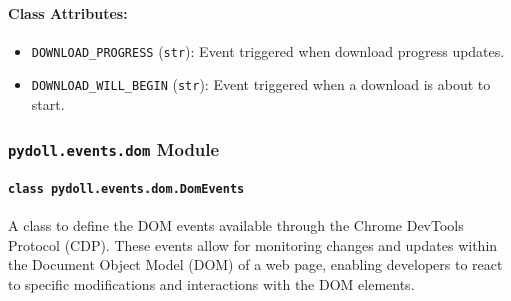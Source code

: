 \documentclass{article}
\begin{document}
\paragraph{Class Attributes:}
\begin{itemize}
    \item \texttt{DOWNLOAD\_PROGRESS} (\texttt{str}): Event triggered when download progress updates.
    \item \texttt{DOWNLOAD\_WILL\_BEGIN} (\texttt{str}): Event triggered when a download is about to start.
\end{itemize}

\subsubsection*{\texttt{pydoll.events.dom} Module}

\paragraph*{\texttt{class pydoll.events.dom.DomEvents}}
\noindent A class to define the DOM events available through the Chrome DevTools Protocol (CDP). These events allow for monitoring changes and updates within the Document Object Model (DOM) of a web page, enabling developers to react to specific modifications and interactions with the DOM elements.
\end{document}
